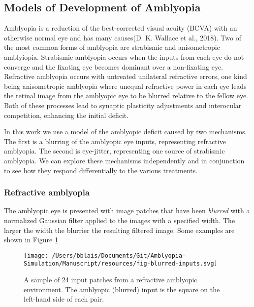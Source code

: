 \documentclass[
  onecolumn]{article}
\begin{document}
\hypertarget{models-of-development-of-amblyopia}{%
\subsection{Models of Development of
Amblyopia}\label{models-of-development-of-amblyopia}}

Amblyopia is a reduction of the best-corrected visual acuity (BCVA) with
an otherwise normal eye and has many causes(D. K. Wallace et al., 2018).
Two of the most common forms of amblyopia are strabismic and
anisometropic amblyiopia. Strabismic amblyopia occurs when the inputs
from each eye do not converge and the fixating eye becomes dominant over
a non-fixating eye. Refractive amblyopia occurs with untreated
unilateral refractive errors, one kind being anisometropic amblyopia
where unequal refractive power in each eye leads the retinal image from
the amblyopic eye to be blurred relative to the fellow eye. Both of
these processes lead to synaptic plasticity adjustments and interocular
competition, enhancing the initial deficit.

In this work we use a model of the amblyopic deficit caused by two
mechanisms. The first is a blurring of the amblyopic eye inputs,
representing refractive amblyopia. The second is eye-jitter,
representing one source of strabismic amblyopia. We can explore these
mechanisms independently and in conjunction to see how they respond
differentially to the various treatments.

\hypertarget{refractive-amblyopia}{%
\subsubsection{Refractive amblyopia}\label{refractive-amblyopia}}

The amblyopic eye is presented with image patches that have been
\emph{blurred} with a normalized Gaussian filter applied to the images
with a specified width. The larger the width the blurrier the resulting
filtered image. Some examples are shown in Figure
\ref{fig:blurred-inputs}

\begin{figure}
\hypertarget{fig:blurred-inputs}{%
\centering
\texttt{[image: /Users/bblais/Documents/Git/Amblyopia-Simulation/Manuscript/resources/fig-blurred-inputs.svg]}
\caption{A sample of 24 input patches from a refractive amblyopic
environment. The amblyopic (blurred) input is the square on the
left-hand side of each pair.}\label{fig:blurred-inputs}
}
\end{figure}
\end{document}
